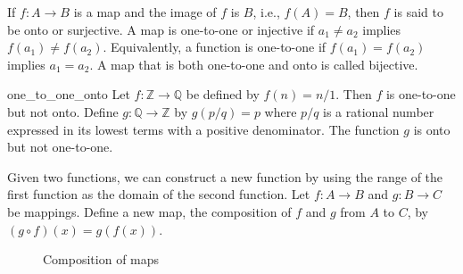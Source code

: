 If $f:A \rightarrow B$ is a map and the image of $f$ is $B$, i.e., $f(A) = B$, then $f$ is said to be {\bfi onto\/} or {\bfi surjective}.  A map is {\bfi one-to-one\/} or {\bfi injective\/} if $a_1 \neq a_2$ implies $f(a_1) \neq f(a_2)$.  Equivalently, a function is one-to-one if $f(a_1) = f(a_2)$ implies $a_1 = a_2$.  A map that is both one-to-one and onto is called {\bfi bijective}.

\begin{example}{one_to_one_onto}
Let $f:{\mathbb Z} \rightarrow {\mathbb Q}$ be defined by $f(n) = n/1$.  Then $f$ is one-to-one but not onto.  Define $g : {\mathbb Q} \rightarrow {\mathbb Z}$ by $g(p/q) = p$ where $p/q$ is a rational number expressed in its lowest terms with a positive denominator.  The function $g$ is onto but not one-to-one. 
\end{example}

Given two functions, we can construct a new function by using the range of the first function as the domain of the second function.  Let $f : A \rightarrow B$ and $g : B \rightarrow C$ be mappings.  Define a new map, the {\bfi composition\/} of $f$ and $g$ from $A$ to $C$, by $(g \circ f)(x) = g(f(x))$.

\begin{figure}[htb]\label{sets_figure_composition} %
\begin{center}
\caption{Composition of maps}
\bigskip
\end{center}
\end{figure}

